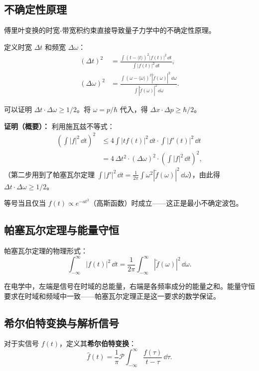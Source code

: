 \subsection{不确定性原理}

傅里叶变换的时宽-带宽积约束直接导致量子力学中的不确定性原理。

定义时宽 $\Delta t$ 和频宽 $\Delta\omega$：
\begin{align}
(\Delta t)^2 &= \frac{\int (t - \langle t\rangle)^2 |f(t)|^2\,\dd t}{\int |f(t)|^2\,\dd t},\\
(\Delta\omega)^2 &= \frac{\int (\omega - \langle\omega\rangle)^2 |\tilde{f}(\omega)|^2\,\dd\omega}{\int |\tilde{f}(\omega)|^2\,\dd\omega}.
\end{align}

可以证明 $\Delta t \cdot \Delta\omega \geq 1/2$。将 $\omega = p/\hbar$ 代入，得 $\Delta x \cdot \Delta p \geq \hbar/2$。

\textbf{证明（概要）：} 利用施瓦兹不等式：
\begin{align}
\left(\int |f|^2\,\dd t\right)^2
&\leq 4\int |t f(t)|^2\,\dd t \cdot \int |f'(t)|^2\,\dd t \\
&= 4\,\Delta t^2 \cdot (\Delta\omega)^2 \cdot \left(\int |f|^2\,\dd t\right)^2,
\end{align}
（第二步用到了帕塞瓦尔定理 $\int|f'|^2\,\dd t = \frac{1}{2\pi}\int\omega^2|\tilde f(\omega)|^2\,\dd\omega$），由此得 $\Delta t\cdot\Delta\omega \geq 1/2$。

等号当且仅当 $f(t) \propto e^{-at^2}$（高斯函数）时成立——这正是最小不确定波包。

\subsection{帕塞瓦尔定理与能量守恒}

帕塞瓦尔定理的物理形式：
\begin{equation}
\int_{-\infty}^{\infty} |f(t)|^2\,\dd t
= \frac{1}{2\pi}\int_{-\infty}^{\infty} |\tilde{f}(\omega)|^2\,\dd\omega.
\label{eq:parseval}
\end{equation}

在电学中，左端是信号在时域的总能量，右端是各频率成分的能量之和。能量守恒要求在时域和频域中一致——帕塞瓦尔定理正是这一要求的数学保证。

\subsection{希尔伯特变换与解析信号}

对于实信号 $f(t)$，定义其\textbf{希尔伯特变换}：
\begin{equation}
\hat{f}(t) = \frac{1}{\pi}\mathcal{P}\int_{-\infty}^{\infty} \frac{f(\tau)}{t-\tau}\,\dd\tau.
\end{equation}

